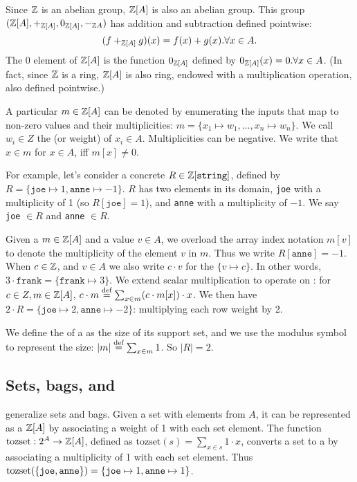 Since $\mathbb{Z}$ is an abelian group, $\mathbb{Z}[A]$ is also an abelian group.  This group
$(\mathbb{Z}[A], +_{\mathbb{Z}[A]}, 0_{\mathbb{Z}[A]}, -_{\mathbb{Z}{A}})$ has addition and subtraction defined pointwise:
$$(f +_{\mathbb{Z}[A]} g)(x) = f(x) + g(x) . \forall x \in A.$$
The $0$ element of $\mathbb{Z}[A]$ is the function $0_{\mathbb{Z}[A]}$ defined by $0_{\mathbb{Z}[A]}(x) = 0 . \forall x \in A$.
(In fact, since $\mathbb{Z}$ is a ring, $\mathbb{Z}[A]$ is also ring, endowed with a multiplication operation,
also defined pointwise.)

A particular \zr $m \in \mathbb{Z}[A]$ can be denoted by enumerating the inputs that map to non-zero values and
their multiplicities:
$m = \{ x_1 \mapsto w_1, \dots, x_n \mapsto w_n \}$.
We call $w_i \in Z$ the  (or weight)
of $x_i \in A$.  Multiplicities can be negative.
We write that $x \in m$ for $x \in A$, iff $m[x] \not= 0$.

For example, let's consider a concrete \zr $R \in \mathbb{Z}[\texttt{string}]$,
defined by $R = \{ \texttt{joe} \mapsto 1, \texttt{anne} \mapsto -1 \}$.
$R$ has two elements in its domain,
\texttt{joe} with a multiplicity of 1 (so $R[\texttt{joe}] = 1$),
and \texttt{anne} with a multiplicity of $-1$.
We say \texttt{joe} $\in R$ and \texttt{anne} $\in R$.

Given a \zr $m \in \mathbb{Z}[A]$ and a value $v \in A$, we overload the array index notation
$m[v]$ to denote the multiplicity of the element $v$ in $m$.
Thus we write $R[\texttt{anne}] = -1$.
When $c \in \mathbb{Z}$, and $v \in A$ we also write $c \cdot v$ for the  \zr $\{
v \mapsto c \}$.  In other words, $3 \cdot \texttt{frank} = \{ \texttt{frank} \mapsto 3 \}$.
We extend scalar multiplication to operate on \zrs: for $c \in Z, m \in \mathbb{Z}[A]$,
$c \cdot m \stackrel{\textrm{\scriptsize def}}{=} \sum_{x \in m} (c \cdot m[x]) \cdot x$.  We then have
$2 \cdot R = \{ \texttt{joe} \mapsto 2, \texttt{anne} \mapsto -2 \}$: multiplying
each row weight by 2.

We define the  of a \zr as the size of its support set, and we use the
modulus symbol to represent the size: $|m| \stackrel{\textrm{\scriptsize def}}{=} \sum_{x \in m} 1$.  So $|R| = 2$.

\subsection{Sets, bags, and \zrs}

\zrs generalize sets and bags.
Given a set with elements from $A$, it can be represented as a \zr $\mathbb{Z}[A]$
by associating a weight of 1 with each set element.  The function $\mbox{tozset}: 2^A \to \mathbb{Z}[A]$,
defined as $\mbox{tozset}(s) = \sum_{x \in s} 1 \cdot x$,
converts a set to a \zr by associating a multiplicity of 1 with each set element.
Thus $\mbox{tozset}(\{ \mbox{\texttt{joe}}, \mbox{\texttt{anne}} \}) = \{ \mbox{\texttt{joe}} \mapsto 1, \mbox{\texttt{anne}} \mapsto 1 \}$.

